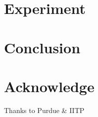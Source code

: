 \documentclass[conference]{IEEEtran}
\begin{document}
\section{Experiment}
\section{Conclusion}

\section*{Acknowledge}
Thanks to Purdue & IITP

\begin{thebibliography}{00}


\end{thebibliography}
\vspace{12pt}
\end{document}
